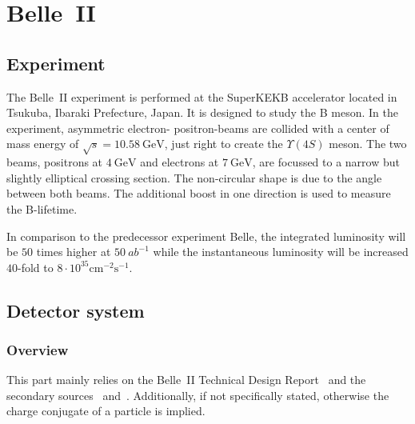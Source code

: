\chapter{Belle~\RN{2}}
\label{chap:belle2_experiment}

\section{Experiment}
\label{sec:experimental}

The Belle~\RN{2} experiment is performed at the SuperKEKB accelerator located in Tsukuba, Ibaraki Prefecture, Japan. It is designed to study the B meson.
In the experiment, asymmetric electron- positron-beams are collided with a center of mass energy of $\sqrt{s} = 10.58 \mathrm{~GeV}$, just right to create the $\Upsilon (4S)$ meson. The two beams, positrons at $4 \mathrm{~GeV}$ and electrons at $7 \mathrm{~GeV}$, are focussed to a narrow but slightly elliptical crossing section. The non-circular shape is due to the angle between both beams. The additional boost in one direction is used to measure the B-lifetime.

In comparison to the predecessor experiment Belle, the integrated luminosity will be $50$ times higher at $50~{ab}^{-1}$ while the instantaneous luminosity will be increased $40$-fold to $8 \cdot 10^{35} \mathrm{cm}^{-2} \mathrm{s}^{-1}$.

\section{Detector system}
\label{sec:detector_system}

\subsection{Overview}
\label{subsec:detector_system_overview}

This part mainly relies on the Belle~\RN{2} Technical Design Report~\cite{Abe:2010gxa} and the secondary sources~\cite{Pulvermacher:SuperKEKBDetectorComponents} and~\cite{Pulvermacher:AnalysisSoftware}. Additionally, if not specifically stated, otherwise the charge conjugate of a particle is implied.

